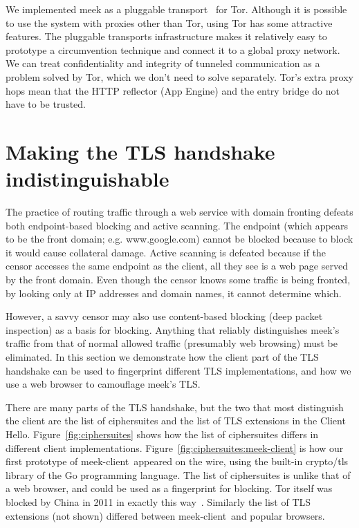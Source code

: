 \documentclass{article}
\def\meekclient{\mbox{meek-client}}
\begin{document}
We implemented meek as a pluggable transport~\cite{pt} for Tor.
Although it is possible to use the system with proxies other than Tor,
using Tor has some attractive features.
The pluggable transports infrastructure makes it relatively easy to prototype
a circumvention technique and connect it to a global proxy network.
We can treat confidentiality and integrity of tunneled communication
as a problem solved by Tor, which we don't need to solve separately.
Tor's extra proxy hops mean that the HTTP reflector (App Engine)
and the entry bridge do not have to be trusted.

\section{Making the TLS handshake indistinguishable}
\label{sec:browserextension}

The practice of routing traffic through a web service with domain fronting
defeats both endpoint-based blocking and active scanning.
The endpoint (which appears to be the front domain; e.g. www.google.com)
cannot be blocked because to block it would cause collateral damage.
Active scanning is defeated because if the censor accesses the same
endpoint as the client, all they see is a web page served by the front domain.
Even though the censor knows some traffic is being fronted,
by looking only at IP addresses and domain names, it cannot determine which.

However, a savvy censor may also use content-based blocking
(deep packet inspection) as a basis for blocking.
Anything that reliably distinguishes meek's traffic from that of normal allowed traffic
(presumably web browsing) must be eliminated.
In this section we demonstrate how the client part of the TLS handshake can be used
to fingerprint different TLS implementations,
and how we use a web browser to camouflage meek's TLS.

There are many parts of the TLS handshake, but the two that
most distinguish the client are the list of ciphersuites and the
list of TLS extensions in the Client Hello.
Figure~\ref{fig:ciphersuites} shows how the list of ciphersuites
differs in different client implementations.
Figure~\ref{fig:ciphersuites:meek-client} is how our first prototype of \meekclient\ appeared on the wire,
using the built-in crypto/tls library of the Go programming language.
The list of ciphersuites is unlike that of a web browser,
and could be used as a fingerprint for blocking.
Tor itself was blocked by China in 2011 in exactly this way~\cite{bug4744}.
Similarly the list of TLS extensions (not shown)
differed between \meekclient\ and popular browsers.
\end{document}
